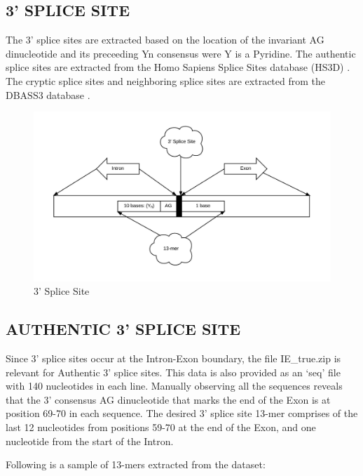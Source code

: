 \documentclass[12pt,a4paper]{article}
\begin{document}
	\subsection{3' SPLICE SITE}
	The 3’ splice sites are extracted based on the location of the invariant AG dinucleotide and its preceeding Yn consensus were Y is a Pyridine. The authentic splice sites are extracted from the Homo Sapiens Splice Sites database (HS3D) \cite{hs3d-1,hs3d-2}. The cryptic splice sites and neighboring splice sites are extracted from the DBASS3 database \cite{dbass-0,dbass-1,dbass-2}.
   	\begin{figure}[H]
   		\includegraphics[width=\textwidth]{"threeprime"}
   		\caption{3' Splice Site}
   		\centering
   	\end{figure}

	\subsection{AUTHENTIC 3' SPLICE SITE}
	Since 3’ splice sites occur at the Intron-Exon boundary, the file IE\_true.zip is relevant for Authentic 3’ splice sites. This data is also provided as an ‘seq’ file with 140 nucleotides in each line. Manually observing all the sequences reveals that the 3’ consensus AG dinucleotide that marks the end of the Exon is at position 69-70 in each sequence. The desired 3’ splice site 13-mer comprises of the last 12 nucleotides from positions 59-70 at the end of the Exon, and one nucleotide from the start of the Intron. \par
	Following is a sample of 13-mers extracted from the dataset:
\end{document}
